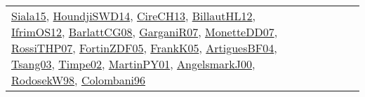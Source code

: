 {\begin{longtable}{llp{6cm}p{6cm}p{6cm}}
\href{articles/Siala15.pdf}{Siala15}\cite{Siala15}, \href{papers/HoundjiSWD14.pdf}{HoundjiSWD14}\cite{HoundjiSWD14}, \href{papers/CireCH13.pdf}{CireCH13}\cite{CireCH13}, \href{papers/BillautHL12.pdf}{BillautHL12}\cite{BillautHL12}, \href{papers/IfrimOS12.pdf}{IfrimOS12}\cite{IfrimOS12}, \href{papers/BarlattCG08.pdf}{BarlattCG08}\cite{BarlattCG08}, \href{papers/GarganiR07.pdf}{GarganiR07}\cite{GarganiR07}, \href{papers/MonetteDD07.pdf}{MonetteDD07}\cite{MonetteDD07}, \href{papers/RossiTHP07.pdf}{RossiTHP07}\cite{RossiTHP07}, \href{papers/FortinZDF05.pdf}{FortinZDF05}\cite{FortinZDF05}, \href{papers/FrankK05.pdf}{FrankK05}\cite{FrankK05}, \href{papers/ArtiguesBF04.pdf}{ArtiguesBF04}\cite{ArtiguesBF04}, \href{articles/Tsang03.pdf}{Tsang03}\cite{Tsang03}, \href{articles/Timpe02.pdf}{Timpe02}\cite{Timpe02}, \href{articles/MartinPY01.pdf}{MartinPY01}\cite{MartinPY01}, \href{papers/AngelsmarkJ00.pdf}{AngelsmarkJ00}\cite{AngelsmarkJ00}, \href{papers/RodosekW98.pdf}{RodosekW98}\cite{RodosekW98}, \href{papers/Colombani96.pdf}{Colombani96}\cite{Colombani96}\\

\end{longtable}}

